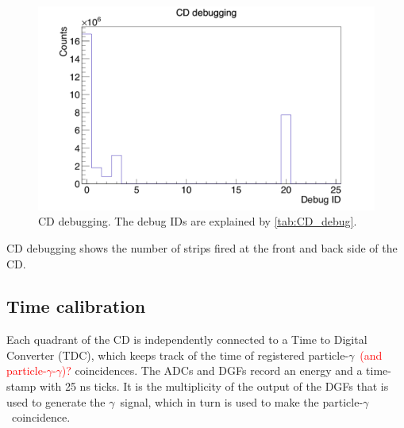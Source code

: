 \documentclass[twoside,english]{uiofysmaster/uiofysmaster}
\newcommand{\ga}{$\gamma$}
\let\orgautoref\autoref
\renewcommand{\autoref}
        {%
		 \def\subsectionautorefname{Section}%
		 \def\subsubsectionautorefname{Section}%
          \orgautoref}
\begin{document}
\begin{figure}[ht]
	\centering
	\includegraphics[width=\textwidth]{../Plots/plotting/cd_debug-user.png}
	\caption{CD debugging. The debug IDs are explained by \autoref{tab:CD_debug}.}
	\label{fig:CD_debug}
\end{figure}


\begin{table}[ht] 
	\centering 
	\caption{CD debugging shows the number of strips fired at the front and back side of the CD.}
	
	\label{tab:CD_debug}
\end{table}



\subsection{Time calibration}\label{ssec:time_cal}
Each quadrant of the CD is independently connected to a Time to Digital Converter (TDC), which keeps track of the time of registered particle-\ga\ \textcolor{red}{(and particle-\ga-\ga)?} coincidences. 
The ADCs and DGFs record an energy and a time-stamp with 25 ns ticks. 
It is the multiplicity of the output of the DGFs that is used to generate the \ga\ signal, which in turn is used to make the particle-\ga\ coincidence.
\end{document}
